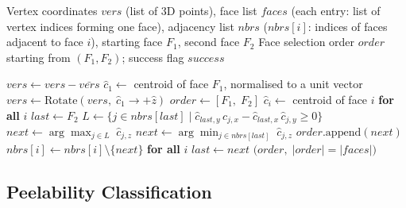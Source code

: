\documentclass[12pt,a4paper]{article}
\theoremstyle{definition}
\begin{document}
\begin{algorithm}[h]
\caption{Apple-Peel Unfolding (3D version)}
\label{alg:3d}
\begin{algorithmic}[1]
\Require
  Vertex coordinates $\mathit{vers}$ (list of 3D points),
  face list $\mathit{faces}$ (each entry: list of vertex indices forming one face),
  adjacency list $\mathit{nbrs}$ ($\mathit{nbrs}[i]$: indices of faces adjacent to face $i$),
  starting face $F_1$, second face $F_2$
\Ensure
  Face selection order $\mathit{order}$ starting from $(F_1, F_2)$;
  success flag $\mathit{success}$

\State $\mathit{vers} \gets \mathit{vers} - \bar{\mathit{vers}}$
\State $\hat{c}_1 \gets$ centroid of face $F_1$, normalised to a unit vector
\State $\mathit{vers} \gets \mathrm{Rotate}(\mathit{vers},\;\hat{c}_1 \to +\hat{z})$
\State $\mathit{order} \gets [F_1,\; F_2]$
\State $\hat{c}_i \gets$ centroid of face $i$ \textbf{for all} $i$
\State $\mathit{last} \gets F_2$
  \State $L \gets \bigl\{j \in \mathit{nbrs}[\mathit{last}]
           \mid \hat{c}_{\mathit{last},y}\,\hat{c}_{j,x}
                - \hat{c}_{\mathit{last},x}\,\hat{c}_{j,y} \geq 0\bigr\}$
    \State $\mathit{next} \gets \arg\max_{j \in L}\; \hat{c}_{j,z}$
  \Else
    \State $\mathit{next} \gets \arg\min_{j \in \mathit{nbrs}[\mathit{last}]}\; \hat{c}_{j,z}$
  \EndIf
  \State $\mathit{order}.\mathrm{append}(\mathit{next})$
  \State $\mathit{nbrs}[i] \gets \mathit{nbrs}[i] \setminus \{\mathit{next}\}$
    \hspace{1.5em}\textbf{for all} $i$
  \State $\mathit{last} \gets \mathit{next}$
\EndWhile
\State \Return $\bigl(\mathit{order},\;|\mathit{order}| = |\mathit{faces}|\bigr)$
\end{algorithmic}
\end{algorithm}

\subsection{Peelability Classification}
\end{document}
